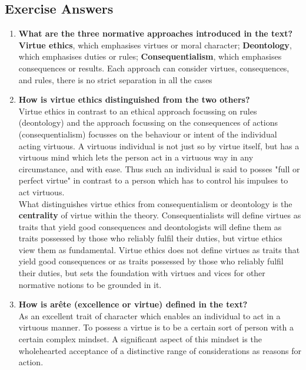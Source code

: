 \documentclass[11pt]{article}
\theoremstyle{definition}
\begin{document}
\subsection{Exercise Answers}
\begin{enumerate}
	\item \textbf{What are the three normative approaches introduced in the text?}\\
	\textbf{Virtue ethics}, which emphasises virtues or moral character; \textbf{Deontology}, which emphasises duties or rules; \textbf{Consequentialism}, which emphasises consequences or results. Each approach can consider virtues, consequences, and rules, there is no strict separation in all the cases
	\item \textbf{How is virtue ethics distinguished from the two others?}\\
	Virtue ethics in contrast to an ethical approach focussing on rules (deontology) and the approach focussing on the consequences of actions (consequentialism) focusses on the behaviour or intent of the individual acting virtuous. A virtuous individual is not just so by virtue itself, but has a virtuous mind which lets the person act in a virtuous way in any circumstance, and with ease. Thus such an individual is said to posses "full or perfect virtue" in contrast to a person which has to control his impulses to act virtuous.\\
	What distinguishes virtue ethics from consequentialism or deontology is the \textbf{centrality} of virtue within the theory. Consequentialists will define virtues as traits that yield good consequences and deontologists will define them as traits possessed by those who reliably fulfil their duties, but virtue ethics view them as fundamental. Virtue ethics does not define virtues as traits that yield good consequences or as traits possessed by those who reliably fulfil their duties, but sets the foundation with virtues and vices for other normative notions to be grounded in it.
	\item \textbf{How is arête (excellence or virtue) defined in the text?}\\
	As an excellent trait of character which enables an individual to act in a virtuous manner. To possess a virtue is to be a certain sort of person with a certain complex mindset. A significant aspect of this mindset is the wholehearted acceptance of a distinctive range of considerations as reasons for action.
\end{enumerate}
\end{document}
